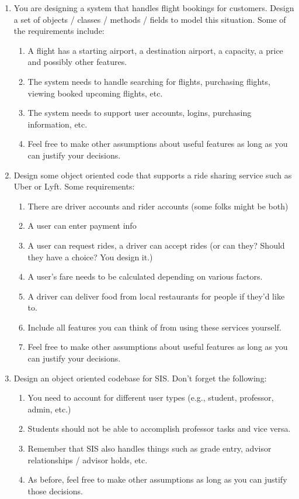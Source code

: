 \documentclass[paper=a4, fontsize=11pt, parskip=full]{scrartcl} %
\numberwithin{equation}{section} %
\numberwithin{figure}{section} %
\numberwithin{table}{section} %
\begin{document}
\begin{enumerate}
	\item You are designing a system that handles flight bookings for customers. Design a set of objects / classes / methods / fields to model this situation. Some of the requirements include:
	\begin{enumerate}
		\item A flight has a starting airport, a destination airport, a capacity, a price and possibly other features.
		\item The system needs to handle searching for flights, purchasing flights, viewing booked upcoming flights, etc.
		\item The system needs to support user accounts, logins, purchasing information, etc.
		\item Feel free to make other assumptions about useful features as long as you can justify your decisions.
	\end{enumerate}

	\item Design some object oriented code that supports a ride sharing service such as Uber or Lyft. Some requirements:
	\begin{enumerate}
		\item There are driver accounts and rider accounts (some folks might be both)
		\item A user can enter payment info
		\item A user can request rides, a driver can accept rides (or can they? Should they have a choice? You design it.)
		\item A user's fare needs to be calculated depending on various factors.
		\item A driver can deliver food from local restaurants for people if they'd like to.
		\item Include all features you can think of from using these services yourself.
		\item Feel free to make other assumptions about useful features as long as you can justify your decisions.
	\end{enumerate}

	\item Design an object oriented codebase for SIS. Don't forget the following:
	\begin{enumerate}
		\item You need to account for different user types (e.g., student, professor, admin, etc.)
		\item Students should not be able to accomplish professor tasks and vice versa.
		\item Remember that SIS also handles things such as grade entry, advisor relationships / advisor holds, etc.
		\item As before, feel free to make other assumptions as long as you can justify those decisions.
	\end{enumerate}
\end{enumerate}
\end{document}
